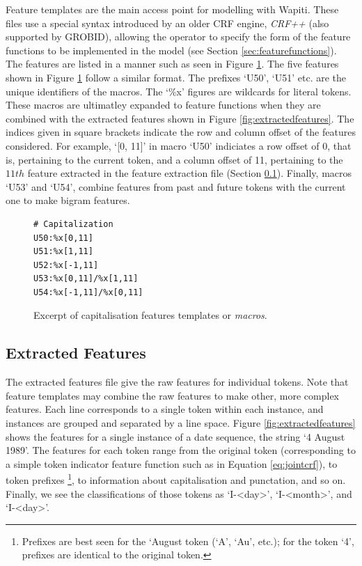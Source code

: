 Feature templates are the main access point for modelling with Wapiti. These files use a special syntax introduced by an older CRF engine, \emph{CRF++} (also supported by GROBID), allowing the operator to specify the form of the feature functions to be implemented in the model (see Section \ref{sec:featurefunctions}). The features are listed in a manner such as seen in Figure \ref{fig:featuretemplatefile}. The five features shown in Figure \ref{fig:featuretemplatefile} follow a similar format. The prefixes `U50', `U51' etc. are the unique identifiers of the macros. The `\%x' figures are wildcards for literal tokens. These macros are ultimatley expanded to feature functions when they are combined with the extracted features shown in Figure \ref{fig:extractedfeatures}. The indices given in square brackets indicate the row and column offset of the features considered. For example, `[0, 11]' in macro `U50' indiciates a row offset of 0, that is, pertaining to the current token, and a column offset of 11, pertaining to the $11th$ feature extracted in the feature extraction file (Section \ref{subsec:extractedfeatures}). Finally, macros `U53' and `U54', combine features from past and future tokens with the current one to make bigram features.

\begin{figure}
\centering
\begin{BVerbatim}
# Capitalization
U50:%x[0,11]
U51:%x[1,11]
U52:%x[-1,11]
U53:%x[0,11]/%x[1,11]
U54:%x[-1,11]/%x[0,11]
\end{BVerbatim}
\caption{Excerpt of capitalisation features templates or \emph{macros}.}
\label{fig:featuretemplatefile}
\end{figure}

\subsection{Extracted Features}
\label{subsec:extractedfeatures}

The extracted features file give the raw features for individual tokens. Note that feature templates may combine the raw features to make other, more complex features. Each line corresponds to a single token within each instance, and instances are grouped and separated by a line space. Figure \ref{fig:extractedfeatures} shows the features for a single instance of a date sequence, the string `4 August 1989'. The features for each token range from the original token (corresponding to a simple token indicator feature function such as in Equation \ref{eq:jointcrf}), to token prefixes \footnote{Prefixes are best seen for the `August token (`A', `Au', etc.); for the token `4', prefixes are identical to the original token.}, to information about capitalisation and punctation, and so on. Finally, we see the classifications of those tokens as `I-<day>', `I-<month>', and `I-<day>'.

